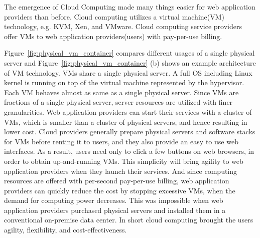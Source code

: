 The emergence of Cloud Computing made many things easier for web application providers than before.
Cloud computing utilizes a virtual machine(VM) technology, e.g. KVM, Xen, and VMware.
Cloud computing service providers offer VMs to web application providers(users) with pay-per-use billing.

Figure~\ref{fig:physical_vm_container} compares different usages of a single physical server and Figure~\ref{fig:physical_vm_container} (b) shows an example architecture of VM technology.
VMs share a single physical server.
A full OS including Linux kernel is running on top of the virtual machine represented by the hypervisor.
Each VM behaves almost as same as a single physical server.
Since VMs are fractions of a single physical server, server resources are utilized with finer granularities.
Web application providers can start their services with a cluster of VMs, which is smaller than a cluster of physical servers, and hence resulting in lower cost.
Cloud providers generally prepare physical servers and software stacks for VMs before renting it to users, and they also provide an easy to use web interfaces.
As a result, users need only to click a few buttons on web browsers, in order to obtain up-and-running VMs.
This simplicity will bring agility to web application providers when they launch their services.
And since computing resources are offered with per-second pay-per-use billing, web application providers can quickly reduce the cost by stopping excessive VMs, when the demand for computing power decreases.
This was impossible when web application providers purchased physical servers and installed them in a conventional on-premise data center.
In short cloud computing brought the users agility, flexibility, and cost-effectiveness.

